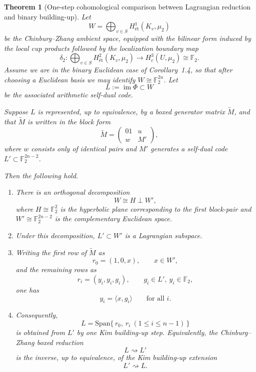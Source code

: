 \documentclass[12pt]{article}
\newtheorem{theorem}{Theorem}[section]
\newcommand{\Span}{\mathrm{Span}}
\newcommand{\et}{\mathrm{ét}}
\newenvironment{blueblock}{\begingroup\color{blue}}{\endgroup}
\begin{document}
\begin{blueblock}
\begin{theorem}[One-step cohomological comparison between Lagrangian reduction and binary building-up]
\label{thm:CZ_Kim_Lagrangian}
Let
\[
W=\bigoplus_{v\in S} H^1_{\et}(K_v,\mu_2)
\]
be the Chinburg--Zhang ambient space, equipped with the bilinear form induced by the
local cup products followed by the localization boundary map
\[
\delta_2:\bigoplus_{v\in S} H^2_{\et}(K_v,\mu_2)\longrightarrow H^3_c(U,\mu_2)\cong \mathbb F_2.
\]
Assume we are in the binary Euclidean case of Corollary~1.4, so that after choosing a Euclidean basis
we may identify \(W\cong \mathbb F_2^{2n}\). Let
\[
L:=\operatorname{im}\Phi \subset W
\]
be the associated arithmetic self-dual code.

Suppose \(L\) is represented, up to equivalence, by a boxed generator matrix \(\widetilde M\), and that
\(\widetilde M\) is written in the block form
\[
\widetilde M=
\begin{pmatrix}
01 & u\\
w & M'
\end{pmatrix},
\]
where \(w\) consists only of identical pairs and \(M'\) generates a self-dual code
\(L' \subset \mathbb F_2^{2n-2}\).

Then the following hold.

\begin{enumerate}
\item There is an orthogonal decomposition
\[
W \cong H \perp W',
\]
where \(H\cong \mathbb F_2^2\) is the hyperbolic plane corresponding to the first block-pair
and \(W'\cong \mathbb F_2^{2n-2}\) is the complementary Euclidean space.

\item Under this decomposition, \(L'\subset W'\) is a Lagrangian subspace.

\item Writing the first row of \(\widetilde M\) as
\[
r_0=(1,0,x), \qquad x\in W',
\]
and the remaining rows as
\[
r_i=(y_i,y_i,g_i), \qquad g_i\in L',\ y_i\in \mathbb F_2,
\]
one has
\[
y_i=\langle x,g_i\rangle
\qquad \text{for all }i.
\]

\item Consequently,
\[
L=\Span\{\,r_0,\ r_i\ (1\le i\le n-1)\,\}
\]
is obtained from \(L'\) by one Kim building-up step. Equivalently, the Chinburg--Zhang boxed reduction
\[
L \rightsquigarrow L'
\]
is the inverse, up to equivalence, of the Kim building-up extension
\[
L' \rightsquigarrow L.
\]
\end{enumerate}


\end{theorem}
\end{blueblock}
\end{document}
